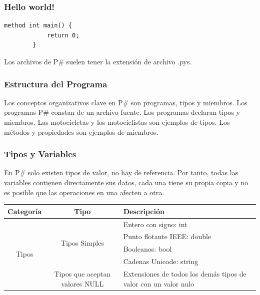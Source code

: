 \documentclass[12pt, letterpaper,spanish]{article}
\theoremstyle{definition}
\theoremstyle{remark}
\begin{document}
	\subsubsection{Hello world!}
	
	\begin{lstlisting}[language={PySharp}]
		method int main() {
			return 0;
		}
	\end{lstlisting}	
	Los archivos de P\# suelen tener la extensión de archivo .pys.\par
	
	\subsubsection{Estructura del Programa}
	Los conceptos organizativos clave en P\# son programas, tipos y miembros. Los programas P\# constan de un archivo fuente. Los programas declaran tipos y miembros. Las motocicletas y los motociclistas son ejemplos de tipos. Los métodos y propiedades son ejemplos de miembros.
	
	\subsubsection{Tipos y Variables}
	En P\# solo existen tipos de valor, no hay de referencia. Por tanto, todas las variables contienen directamente sus datos, cada una tiene su propia copia y no es posible que las operaciones en una afecten a otra.\par
	\begin{center}
		\begin{tabular}{| c | c | m{5cm} | }
			\hline
			Categoría & Tipo & Descripción \\ \hline
			\multirow{5}{*}{Tipos} & \multirow{4}{*}{Tipos Simples} & Entero con signo: int \\ \cline{3-3}
			&  & Punto flotante IEEE: double \\ \cline{3-3}
			&  & Booleanos: bool \\ \cline{3-3}
			&  & Cadenas Unicode: string \\ \cline{2-3}
			& Tipos que aceptan valores NULL & Extensiones de todos los demás tipos de valor con un valor nulo \\ \hline
		\end{tabular}
	\end{center}
\end{document}
